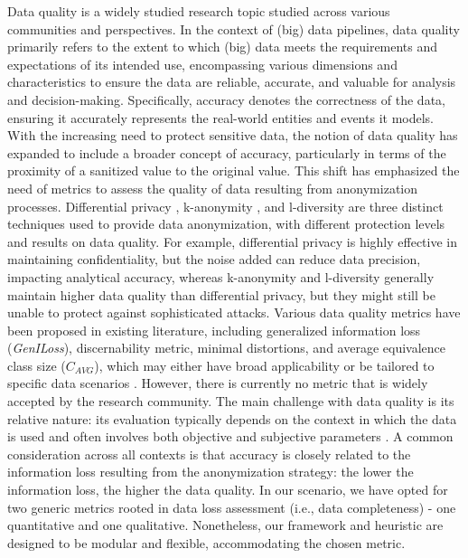 Data quality is a widely studied research topic studied across various communities and perspectives. In the context of (big) data pipelines, data quality primarily refers to the extent to which (big) data meets the requirements and expectations of its intended use, encompassing various dimensions and characteristics to ensure the data are reliable, accurate, and valuable for analysis and decision-making. Specifically, accuracy denotes the correctness of the data, ensuring it accurately represents the real-world entities and events it models.
    {\color{OurColor}
        With the increasing need to protect sensitive data, the notion of data quality has expanded to include a broader concept of accuracy, particularly in terms of the proximity of a sanitized value to the original value.
        This shift has emphasized the need of metrics to assess the quality of data resulting from anonymization processes.
        Differential privacy \cite{dwork2008differential}, k-anonymity \cite{k-anon}, and l-diversity \cite{l-diversity} are three distinct techniques used to provide data anonymization, with different protection levels and results on data quality. For example, differential privacy is highly effective in maintaining confidentiality, but the noise added can reduce data precision, impacting analytical accuracy, whereas k-anonymity and l-diversity generally maintain higher data quality than differential privacy, but they might still be unable to protect against sophisticated attacks.
    }
Various data quality metrics have been proposed in existing literature, including generalized information loss (\textit{GenILoss}), discernability metric, minimal distortions, and average equivalence class size ($C_{AVG}$), which may either have broad applicability or be tailored to specific data scenarios \cite{Majeed2021AnonymizationTF,bookMetrics,reviewMetrics}. However, there is currently no metric that is widely accepted by the research community. The main challenge with data quality is its relative nature: its evaluation typically depends on the context in which the data is used and often involves both objective and subjective parameters \cite{dataAccuracy,dataQuality}.
%
A common consideration across all contexts is that accuracy is closely related to the information loss resulting from the anonymization strategy: the lower the information loss, the higher the data quality. In our scenario, we have opted for two generic metrics rooted in data loss assessment (i.e., data completeness) - one quantitative and one qualitative. Nonetheless, our framework and heuristic are designed to be modular and flexible, accommodating the chosen metric.

